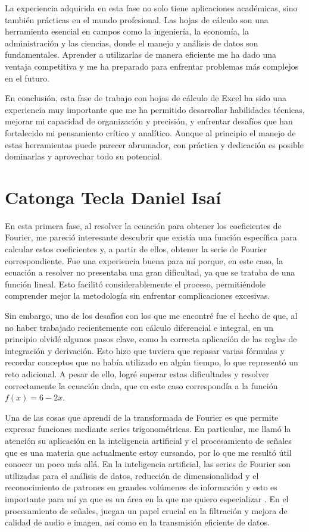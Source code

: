 {La experiencia adquirida en esta fase no solo tiene aplicaciones académicas, sino también prácticas en el mundo profesional. Las hojas de cálculo son una herramienta esencial en campos como la ingeniería, la economía, la administración y las ciencias, donde el manejo y análisis de datos son fundamentales. Aprender a utilizarlas de manera eficiente me ha dado una ventaja competitiva y me ha preparado para enfrentar problemas más complejos en el futuro.

En conclusión, esta fase de trabajo con hojas de cálculo de Excel ha sido una experiencia muy importante que me ha permitido desarrollar habilidades técnicas, mejorar mi capacidad de organización y precisión, y enfrentar desafíos que han fortalecido mi pensamiento crítico y analítico. Aunque al principio el manejo de estas herramientas puede parecer abrumador, con práctica y dedicación es posible dominarlas y aprovechar todo su potencial.



\newpage
\section{Catonga Tecla Daniel Isaí}

En esta primera fase, al resolver la ecuación para obtener los coeficientes de Fourier, me pareció interesante descubrir que existía una función específica para calcular estos coeficientes y, a partir de ellos, obtener la serie de Fourier correspondiente. Fue una experiencia buena para mí porque, en este caso, la ecuación a resolver no presentaba una gran dificultad, ya que se trataba de una función lineal. Esto facilitó considerablemente el proceso, permitiéndole comprender mejor la metodología sin enfrentar complicaciones excesivas.

Sin embargo, uno de los desafíos con los que me encontré fue el hecho de que, al no haber trabajado recientemente con cálculo diferencial e integral, en un principio olvidé algunos pasos clave, como la correcta aplicación de las reglas de integración y derivación. Esto hizo que tuviera que repasar varias fórmulas y recordar conceptos que no había utilizado en algún tiempo, lo que representó un reto adicional.
A pesar de ello, logré superar estas dificultades y resolver correctamente la ecuación dada, que en este caso correspondía a la función \(f(x)=6-2x \). 

Una de las cosas que aprendí de la transformada de Fourier es que permite expresar funciones mediante series trigonométricas. En particular, me llamó la atención su aplicación en la inteligencia artificial y el procesamiento de señales que es una materia que actualmente estoy cursando, por lo que me resultó útil conocer un poco más allá. En la inteligencia artificial, las series de Fourier son utilizadas para el análisis de datos, reducción de dimensionalidad y el reconocimiento de patrones en grandes volúmenes de información y esto es importante para mí ya que es un área en la que me quiero especializar . En el procesamiento de señales, juegan un papel crucial en la filtración y mejora de calidad de audio e imagen, así como en la transmisión eficiente de datos.

}

